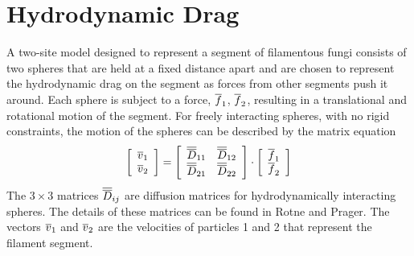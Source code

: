 \documentclass[12pt]{article}
\begin{document}
\section{Hydrodynamic Drag}
A two-site model designed to represent a segment of filamentous fungi consists
of two spheres that are held at a fixed distance apart and are chosen to represent
the hydrodynamic drag on the segment as forces from other segments push
it around. Each sphere is subject to a force, $\overline{f}_1$, $\overline{f}_2$, resulting in
a translational and rotational motion of the segment. For freely interacting
spheres, with no rigid constraints, the motion of the spheres can be described
by the matrix equation
\[
\left[\begin{array}{c}\overline{v}_1 \\ \overline{v}_2 \end{array}\right] =
\left[\begin{array}{cc} \overline{\overline{D}}_{11} & \overline{\overline{D}}_{12} \\
\overline{\overline{D}}_{21} & \overline{\overline{D}}_{22} \end{array}\right]
\cdot\left[\begin{array}{c} \overline{f}_1 \\ \overline{f}_2 \end{array}\right]
\]
The $3\times 3$ matrices $\overline{\overline{D}}_{ij}$ are diffusion matrices for hydrodynamically
interacting spheres. The details of these matrices can be found in Rotne and
Prager\cite{RP}. The vectors $\overline{v}_1$ and $\overline{v}_2$ are the
velocities of particles 1 and 2 that represent the filament segment.
\end{document}
